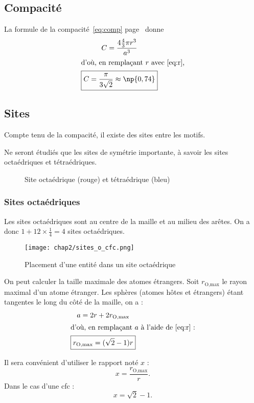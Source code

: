 \subsection{Compacité}
La formule de la compacité~\ref{eq:comp} page~\pageref{eq:comp} donne
\begin{gather}
    C = \frac{4 \frac{4}{3} \pi r^3}{a^3}\\
    \intertext{d'où, en remplaçant $r$ avec~\ref{eq:r},}
    \boxed{C = \frac{\pi}{3\sqrt{2}} \approx \np{0,74}}
\end{gather}

\subsection{Sites}
Compte tenu de la compacité, il existe des sites entre les motifs.
\begin{rem}
    Ne seront étudiés que les sites de symétrie importante,
    à savoir les sites octaédriques et tétraédriques.
\end{rem}
\begin{figure}
    \centering
    
    \caption[Sites d'une structure cfc]
    {Site octaédrique (rouge) et tétraédrique (bleu)}\label{fig:2_cfc_sites}
\end{figure}
\subsubsection{Sites octaédriques}
Les sites octaédriques sont au centre de la maille et au milieu
des arêtes. On a donc $1 + 12 \times \frac{1}{4} = 4$ sites octaédriques.
\begin{figure}
    \centering
    \texttt{[image: chap2/sites\_o\_cfc.png]}
    \caption{Placement d'une entité dans un site octaédrique}\label{fig:site_o_cfc}
\end{figure}
On peut calculer la taille maximale des atomes étrangers.
Soit $r_{\text{O,max}}$ le rayon maximal d'un atome étranger.
Les sphères (atomes h\^otes et étrangers) étant tangentes le
long du c\^oté de la maille, on a :
\begin{gather}
    a = 2r + 2r_{\text{O,max}}\\
    \intertext{d'où, en remplaçant $a$ à l'aide de~\ref{eq:r} :}
    \boxed{r_{\text{O,max}} = (\sqrt{2} - 1)r} \label{eq:rmax}
\end{gather}
\begin{rem}
    Il sera convénient d'utiliser le rapport noté $x$ :
    \begin{equation*}
        x = \frac{r_{\text{O,max}}}{r}\text{.}
    \end{equation*}
    Dans le cas d'une cfc :
    \begin{equation*}
        x = \sqrt{2} - 1\text{.}
    \end{equation*}
\end{rem}

